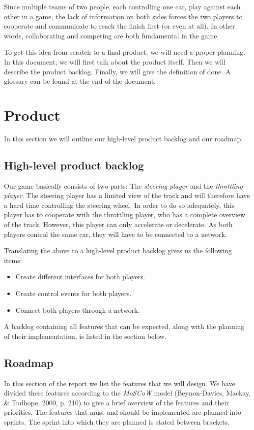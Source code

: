 \documentclass[11pt,twoside,a4paper]{article}
\begin{document}
Since multiple teams of two people, each controlling one car, play against each other in a game, the lack of information on both sides forces the two players to cooperate and communicate to reach the finish first (or even at all). In other words, collaborating and competing are both fundamental in the game.

To get this idea from scratch to a final product, we will need a proper planning. In this document, we will first talk about the product itself. Then we will describe the product backlog. Finally, we will give the definition of done. A glossary can be found at the end of the document.


\section{Product}

In this section we will outline our high-level product backlog and our roadmap.


\subsection{High-level product backlog}
Our game basically consists of two parts: The \emph{steering player} and the \emph{throttling player}. The steering player has a limited view of the track and will therefore have a hard time controlling the steering wheel. In order to do so adequately, this player has to cooperate with the throttling player, who has a complete overview of the track. However, this player can only accelerate or decelerate. As both players control the same car, they will have to be connected to a network.

Translating the above to a high-level product backlog gives us the following items:

\begin{itemize}
	\item Create different interfaces for both players.
	\item Create control events for both players.
	\item Connect both players through a network.
\end{itemize}

A backlog containing all features that can be expected, along with the planning of their implementation, is listed in the section below.


\newpage

\subsection{Roadmap}
In this section of the report we list the features that we will design. We have divided these features according to the \emph{MoSCoW} model (Beynon-Davies, Mackay, \& Tudhope, 2000, p. 210) to give a brief overview of the features and their priorities. The features that must and should be implemented are planned into sprints. The sprint into which they are planned is stated between brackets.
\end{document}
